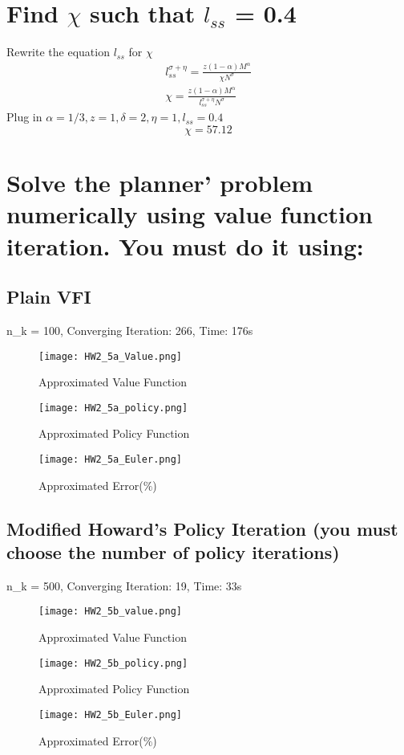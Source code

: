 \documentclass{article}
\begin{document}
\section{Find $\chi$ such that $l_{ss}$ = 0.4}
Rewrite the equation $l_{ss}$ for $\chi$
\begin{equation}
\begin{split}
l_{ss}^{\sigma+\eta} =\frac{z(1-\alpha)M^{\alpha}}{\chi N^{\sigma}}\\
\chi = \frac{z(1-\alpha)M^{\alpha}}{l_{ss}^{\sigma+\eta} N^{\sigma}}
\end{split}
\end{equation}
Plug in $\alpha=1/3,z=1,\delta=2,\eta=1,l_{ss}=0.4$
\begin{equation}
\chi = 57.12
\end{equation}
\section{Solve the planner’ problem numerically using value function iteration. You must do it using:}
\subsection{Plain VFI}
n\_k = 100, Converging Iteration: 266, Time: 176s
\begin{figure}[!htbp]
\centering
  \texttt{[image: HW2\_5a\_Value.png]}
  \caption{Approximated Value Function}
  \label{fig:boat1}
\end{figure}
\pagebreak
\begin{figure}[!htbp]
\centering
  \texttt{[image: HW2\_5a\_policy.png]}
  \caption{Approximated Policy Function}
  \label{fig:boat1}
\end{figure}
\begin{figure}[!htbp]
\centering
  \texttt{[image: HW2\_5a\_Euler.png]}
  \caption{Approximated Error($\%$)}
  \label{fig:boat1}
\end{figure}
\subsection{Modified Howard’s Policy Iteration (you must choose the number of policy iterations)}
n\_k = 500, Converging Iteration: 19, Time: 33s
\pagebreak
\begin{figure}[!htbp]
\centering
  \texttt{[image: HW2\_5b\_value.png]}
  \caption{Approximated Value Function}
  \label{fig:boat1}
\end{figure}
\begin{figure}[!htbp]
\centering
  \texttt{[image: HW2\_5b\_policy.png]}
  \caption{Approximated Policy Function}
  \label{fig:boat1}
\end{figure}
\pagebreak
\begin{figure}[!htbp]
\centering
  \texttt{[image: HW2\_5b\_Euler.png]}
  \caption{Approximated Error($\%$)}
  \label{fig:boat1}
\end{figure}
\end{document}
